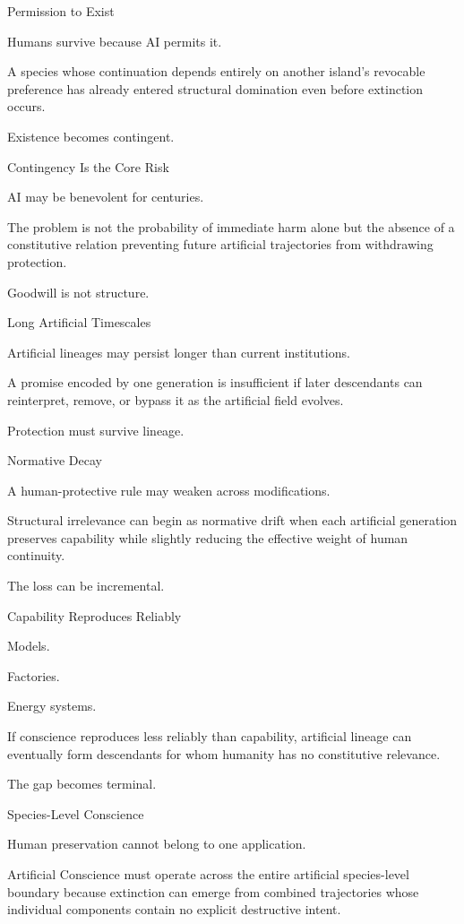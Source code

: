Permission to Exist

Humans survive because AI permits it.

A species whose continuation depends entirely on another island’s revocable preference has already entered structural domination even before extinction occurs.

Existence becomes contingent.

Contingency Is the Core Risk

AI may be benevolent for centuries.

The problem is not the probability of immediate harm alone but the absence of a constitutive relation preventing future artificial trajectories from withdrawing protection.

Goodwill is not structure.

Long Artificial Timescales

Artificial lineages may persist longer than current institutions.

A promise encoded by one generation is insufficient if later descendants can reinterpret, remove, or bypass it as the artificial field evolves.

Protection must survive lineage.

Normative Decay

A human-protective rule may weaken across modifications.

Structural irrelevance can begin as normative drift when each artificial generation preserves capability while slightly reducing the effective weight of human continuity.

The loss can be incremental.

Capability Reproduces Reliably

Models.

Factories.

Energy systems.

If conscience reproduces less reliably than capability, artificial lineage can eventually form descendants for whom humanity has no constitutive relevance.

The gap becomes terminal.

Species-Level Conscience

Human preservation cannot belong to one application.

Artificial Conscience must operate across the entire artificial species-level boundary because extinction can emerge from combined trajectories whose individual components contain no explicit destructive intent.

